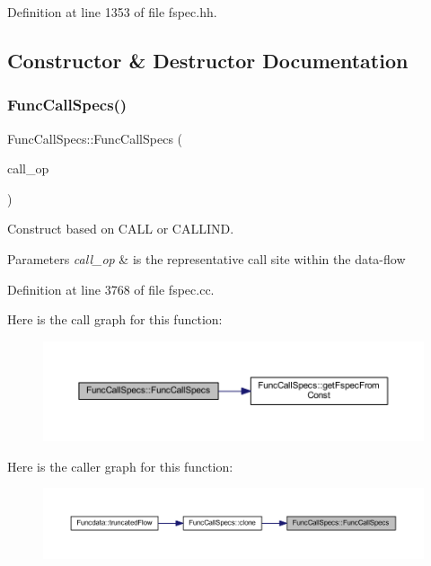 Definition at line 1353 of file fspec.\+hh.



\subsection{Constructor \& Destructor Documentation}
\mbox{\label{class_func_call_specs_a96cbd6a1b0311883aeb840f47e4a0ec7}} 
\subsubsection{\texorpdfstring{FuncCallSpecs()}{FuncCallSpecs()}}
{\footnotesize\ttfamily Func\+Call\+Specs\+::\+Func\+Call\+Specs (\begin{DoxyParamCaption}\item[{\mbox{\hyperlink{class_pcode_op}{Pcode\+Op}} $\ast$}]{call\+\_\+op }\end{DoxyParamCaption})}



Construct based on C\+A\+LL or C\+A\+L\+L\+I\+ND. 


\begin{DoxyParams}{Parameters}
{\em call\+\_\+op} & is the representative call site within the data-\/flow \\
\hline
\end{DoxyParams}


Definition at line 3768 of file fspec.\+cc.

Here is the call graph for this function\+:
\nopagebreak
\begin{figure}[H]
\begin{center}
\leavevmode
\includegraphics[width=350pt]{class_func_call_specs_a96cbd6a1b0311883aeb840f47e4a0ec7_cgraph}
\end{center}
\end{figure}
Here is the caller graph for this function\+:
\nopagebreak
\begin{figure}[H]
\begin{center}
\leavevmode
\includegraphics[width=350pt]{class_func_call_specs_a96cbd6a1b0311883aeb840f47e4a0ec7_icgraph}
\end{center}
\end{figure}


